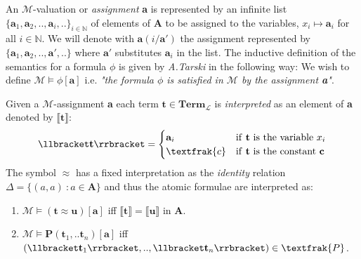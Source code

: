An $\mathcal{M}$-valuation or \emph{assignment} \textbf{a} is represented by an infinite list $\{\textbf{a}_1,\textbf{a}_2,..,\textbf{a}_i,..\}_{i\in \mathbb{N}}$ of elements of \textbf{A} to be assigned to the variables, $x_i \mapsto \textbf{a}_i $ for all $i\in \mathbb{N}$.\newline
We will denote with $\textbf{a}(i/\textbf{a}')$ the assignment represented by $\{\textbf{a}_1,\textbf{a}_2,..,\textbf{a}',..\}$ where $\textbf{a}'$ substitutes $\textbf{a}_i$ in the list. \newline 
The inductive definition of the semantics for a formula $\phi$ is given by \emph{A.Tarski} in the following way:
\newline
We wish to define $\mathcal{M} \vDash \phi[\textbf{a}]$ i.e. \emph{"the formula $\phi$ is satisfied in $\mathcal{M}$ by the assignment \textbf{a}"}. \newline 

Given a $\mathcal{M}$-assignment \textbf{a}  each term $\textbf{t}\in \textbf{Term}_\mathcal{L}$ is \emph{interpreted} as an element of \textbf{a} denoted by $\llbracket \textbf{t} \rrbracket$:
\begin{equation}
	\llbracket \textbf{t} \rrbracket =
	\begin{cases}
			\textbf{a}_i & \text{if \textbf{t} is the variable $x_i$}\\
			\textfrak{c} & \text{if \textbf{t} is the constant \textbf{c}}
		\end{cases}   
\end{equation}  
The symbol $\approx$ has a fixed interpretation as the \emph{identity} relation $ \Delta = \{(a,a)\ : a \in \textbf{A} \} $ and thus the atomic formulae are interpreted as:
\begin{enumerate}
	\item  $\mathcal{M} \vDash (\textbf{t} \approx \textbf{u})[\textbf{a}]$ iff $\llbracket \textbf{t} \rrbracket = \llbracket \textbf{u} \rrbracket$ in \textbf{A}.
	\item $\mathcal{M} \vDash \textbf{P}(\textbf{t}_1,..\textbf{t}_n)[\textbf{a}]$ iff $(\llbracket \textbf{t}_1 \rrbracket,..,\llbracket \textbf{t}_n \rrbracket ) \in \textfrak{P}$.
\end{enumerate}

